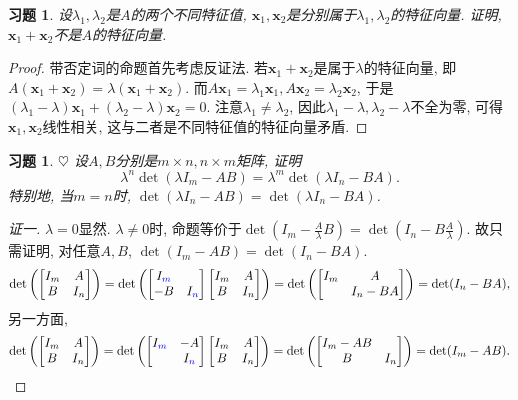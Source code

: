\documentclass{ctexart}
\newtheorem{exercise}[thm]{习题}
\newcommand\bs[1]{\boldsymbol{ #1}}
\def\hard{$\heartsuit$}
\begin{document}
\begin{exercise}
设$\lambda_1, \lambda_2$是$A$的两个不同特征值, $\bs x_1, \bs x_2$是分别属于$\lambda_1, \lambda_2$的特征向量. 
证明, $\bs x_1+\bs x_2$不是$A$的特征向量. 
\end{exercise}
\begin{proof}
	带否定词的命题首先考虑反证法. 若$\bs x_1+\bs x_2$是属于$\lambda$的特征向量, 即$A(\bs x_1+\bs x_2)=\lambda(\bs x_1+\bs x_2)$. 而$A\bs x_1=\lambda_1\bs x_1, A\bs x_2=\lambda_2\bs x_2$, 于是$(\lambda_1-\lambda)\bs x_1+(\lambda_2-\lambda)\bs x_2=0$. 
	注意$\lambda_1\ne\lambda_2$, 因此$\lambda_1-\lambda,\lambda_2-\lambda$不全为零, 可得$\bs x_1,\bs x_2$线性相关, 这与二者是不同特征值的特征向量矛盾. 
\end{proof}

\begin{exercise} \hard
设$A, B$分别是$m\times n, n\times m$矩阵, 证明
\[
\lambda^n\det(\lambda I_m-AB)=\lambda^m\det(\lambda I_n-BA).
\]
特别地, 当$m=n$时, $\det(\lambda I_n-AB)=\det(\lambda I_n-BA)$. 
\end{exercise}
\begin{proof}[证一]
	$\lambda=0$显然. 
	$\lambda\ne 0$时, 命题等价于$
\det(I_m-\frac{A}{\lambda}B)=\det(I_n-B\frac{A}{\lambda})
$. 故只需证明, 对任意$A,B$, $
\det(I_m-AB)=\det(I_n-BA)
$. 
	\[
		\det\left( \begin{bmatrix}
			 I_m & A \\ B &  I_n
	\end{bmatrix} \right)
	=\det\left( \begin{bmatrix}
		I_{\color{blue}m} & \\ -B & I_{\color{blue}n}
	\end{bmatrix}\begin{bmatrix}
			 I_m & A \\ B &  I_n
	\end{bmatrix} \right)
	=\det\left( \begin{bmatrix}
			 I_m & A \\  &  I_n-BA
	\end{bmatrix} \right)
	=\det(I_n-BA),
	\]另一方面, 
	\[
		\det\left( \begin{bmatrix}
				 I_m & A \\ B &  I_n
		\end{bmatrix} \right)
		=\det\left( \begin{bmatrix}
			I_{\color{blue}m} & -A\\  & I_{\color{blue}n}
		\end{bmatrix}\begin{bmatrix}
				 I_m & A \\ B &  I_n
		\end{bmatrix} \right)
		=\det\left( \begin{bmatrix}
				 I_m-AB &  \\ B &  I_n
		\end{bmatrix} \right)
		=\det(I_m-AB).
	\]
\end{proof}
\end{document}
